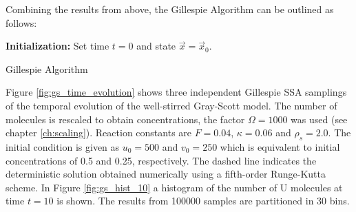 Combining the results from above, the Gillespie Algorithm can be outlined as follows: \\
\begin{framed}
\begin{algorithm}[H]
\DontPrintSemicolon
{}
 \textbf{Initialization:} Set time $t = 0$ and state $\vec{x} = \vec{x}_0$.\;
 \caption{Gillespie Algorithm}
\end{algorithm}
\end{framed}

Figure \ref{fig:gs_time_evolution} shows three independent Gillespie SSA samplings of the temporal evolution of the well-stirred Gray-Scott model. The number of molecules is rescaled to obtain concentrations, the factor $\Omega = 1000$ was used (see chapter \ref{ch:scaling}). Reaction constants are $F=0.04$, $\kappa = 0.06$ and $\rho_s = 2.0$. The initial condition is given as $u_0=500$ and $v_0 = 250$ which is equivalent to initial concentrations of 0.5 and 0.25, respectively. The dashed line indicates the deterministic solution obtained numerically using a fifth-order Runge-Kutta scheme. In Figure \ref{fig:gs_hist_10} a histogram of the number of U molecules at time $t=10$ is shown. The results from 100000 samples are partitioned in 30 bins. 

